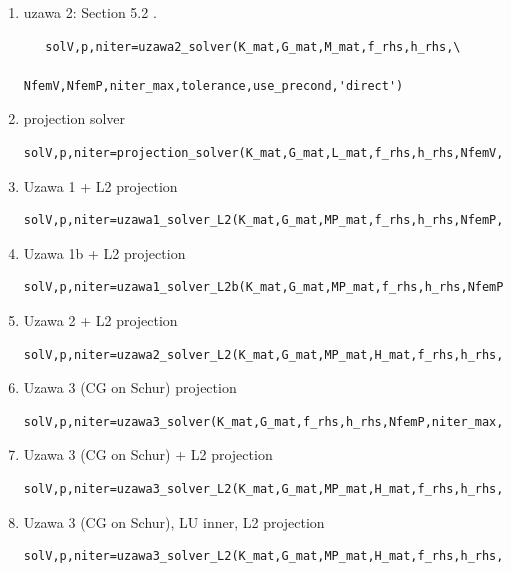 \begin{enumerate}
\item uzawa 2: Section 5.2 \cite{braess}. 
\begin{lstlisting}
   solV,p,niter=uzawa2_solver(K_mat,G_mat,M_mat,f_rhs,h_rhs,\
                       NfemV,NfemP,niter_max,tolerance,use_precond,'direct')
\end{lstlisting}

\item projection solver 
\begin{lstlisting}
solV,p,niter=projection_solver(K_mat,G_mat,L_mat,f_rhs,h_rhs,NfemV,NfemP,niter_max,tolerance)
\end{lstlisting}

\item Uzawa 1 + L2 projection
\begin{lstlisting}
solV,p,niter=uzawa1_solver_L2(K_mat,G_mat,MP_mat,f_rhs,h_rhs,NfemP,niter_max,tolerance,omega)
\end{lstlisting}

\item Uzawa 1b + L2 projection
\begin{lstlisting}
solV,p,niter=uzawa1_solver_L2b(K_mat,G_mat,MP_mat,f_rhs,h_rhs,NfemP,niter_max,tolerance,omega)
\end{lstlisting}

\item Uzawa 2 + L2 projection
\begin{lstlisting}
solV,p,niter=uzawa2_solver_L2(K_mat,G_mat,MP_mat,H_mat,f_rhs,h_rhs,NfemP,niter_max,tolerance)
\end{lstlisting}

\item Uzawa 3 (CG on Schur) projection
\begin{lstlisting}
solV,p,niter=uzawa3_solver(K_mat,G_mat,f_rhs,h_rhs,NfemP,niter_max,tolerance)
\end{lstlisting}

\item Uzawa 3 (CG on Schur) + L2 projection
\begin{lstlisting}
solV,p,niter=uzawa3_solver_L2(K_mat,G_mat,MP_mat,H_mat,f_rhs,h_rhs,NfemP,niter_max,tolerance,'direct')
\end{lstlisting}

\item Uzawa 3 (CG on Schur), LU inner, L2 projection
\begin{lstlisting}
solV,p,niter=uzawa3_solver_L2(K_mat,G_mat,MP_mat,H_mat,f_rhs,h_rhs,NfemP,niter_max,tolerance,'splu')
\end{lstlisting}


\end{enumerate}


